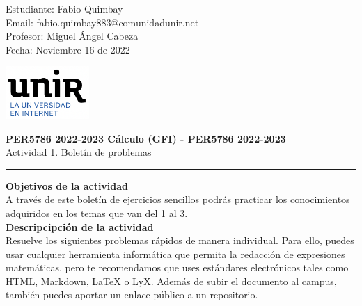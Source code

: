 \documentclass[11pt,letterpaper]{article}
\begin{document}
\pagestyle{plain}

\begin{flushleft}
	Estudiante: Fabio Quimbay\\
	Email: fabio.quimbay883@comunidadunir.net\\
	Profesor: Miguel Ángel Cabeza\\
	Fecha: Noviembre 16 de 2022\\
\end{flushleft}

\begin{flushright}\vspace{-15mm}
\includegraphics[height=2cm]{logo.png}
\end{flushright}
 
\begin{center}\vspace{0cm}
\textbf{\large PER5786 2022-2023  Cálculo (GFI) - PER5786 2022-2023}\\
Actividad 1. Boletín de problemas
\end{center}

 
\rule{\linewidth}{0.1mm}

\bigskip
\bigskip

\textbf{Objetivos de la actividad}\\

A través de este boletín de ejercicios sencillos podrás practicar los conocimientos adquiridos en los temas que van del 1 al 3.\\

\textbf{Descripcipción de la actividad}\\

Resuelve los siguientes problemas rápidos de manera individual. Para ello, puedes usar cualquier herramienta informática que permita la redacción de expresiones matemáticas, pero te recomendamos que uses estándares electrónicos tales como HTML, Markdown, LaTeX o LyX. Además de subir el documento al campus, también puedes aportar un enlace público a un repositorio. 

\end{document}
